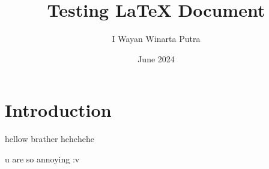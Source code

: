 \documentclass{article}
\title{Testing LaTeX Document}
\author{I Wayan Winarta Putra}
\date{June 2024}
\begin{document}
\maketitle

\section{Introduction}
hellow brather hehehehe

u are so annoying :v
\end{document}
